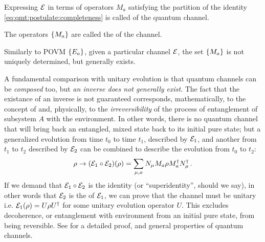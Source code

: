 Expressing $\mathcal{E}$ in terms of operators $M_a$
satisfying the partition of the identity \eqref{eq:qmt:postulate:completeness}
is called
 of the quantum channel.

The operators $\left\{M_a\right\}$ are called the 
of the channel.

Similarly to POVM $\left\{E_a\right\}$, given a particular channel $\mathcal{E}$,
the set $\left\{M_a\right\}$ is not uniquely determined, but
generally exists.

A fundamental comparison with unitary evolution is that
quantum channels can be \emph{composed} too, but \emph{an inverse
does not generally exist}.
The fact that the existance of an inverse is not guaranteed corresponds,
mathematically, to the concept of 
and, physically, to the \emph{irreversibility} of the process
of entanglement of subsystem $A$ with the environment. In other words,
there is no quantum channel that will bring back an entangled,
mixed state back to its initial pure state;
but a generalized evolution from time $t_0$ to time $t_1$,
described by $\mathcal{E}_1$,
and another from $t_1$ to $t_2$ described by $\mathcal{E}_2$
can be combined to describe the evolution from $t_0$ to $t_2$:
\[
  \rho \rightarrow \qty(\mathcal{E}_1 \circ \mathcal{E}_2) (\rho) =
  \sum_{\mu,a} N_{\mu} M_a \rho M_a^{\dagger} N_{\mu}^{\dagger}
  \,\text{.}
\]
If we demand that $\mathcal{E}_1 \circ \mathcal{E}_2$
is the identity (or ``superidentity'', should we say),
in other words that $\mathcal{E}_2$
is the  of $\mathcal{E}_1$,
we can prove that the channel must be unitary i.e.
$\mathcal{E}_1(\rho) = U \rho U^{\dagger}$
for some unitary evolution operator $U$.
This excludes decoherence,
or entanglement with environment from an initial pure state,
from being reversible.
See \cite[sec.3.2]{PreskillNotes} for a detailed proof,
and general properties of quantum channels.
